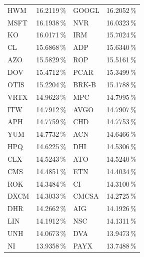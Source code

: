 \begin{longtable}{l c | l c}
    HWM    & 16.2119\,\%            & GOOGL  & 16.2052\,\%                                   \\
    MSFT   & 16.1938\,\%            & NVR    & 16.0323\,\%                                   \\
    KO     & 16.0171\,\%            & IRM    & 15.7024\,\%                                   \\
    CL     & 15.6868\,\%            & ADP    & 15.6340\,\%                                   \\
    AZO    & 15.5829\,\%            & ROP    & 15.5161\,\%                                   \\
    DOV    & 15.4712\,\%            & PCAR   & 15.3499\,\%                                   \\
    OTIS   & 15.2204\,\%            & BRK-B  & 15.1788\,\%                                   \\
    VRTX   & 14.9623\,\%            & MPC    & 14.7995\,\%                                   \\
    ITW    & 14.7912\,\%            & AVGO   & 14.7907\,\%                                   \\
    APH    & 14.7759\,\%            & CHD    & 14.7753\,\%                                   \\
    YUM    & 14.7732\,\%            & ACN    & 14.6466\,\%                                   \\
    HPQ    & 14.6225\,\%            & DHI    & 14.5306\,\%                                   \\
    CLX    & 14.5243\,\%            & ATO    & 14.5240\,\%                                   \\
    CMS    & 14.4851\,\%            & ETN    & 14.4034\,\%                                   \\
    ROK    & 14.3484\,\%            & CI     & 14.3100\,\%                                   \\
    DXCM   & 14.3033\,\%            & CMCSA  & 14.2725\,\%                                   \\
    DHR    & 14.2662\,\%            & AIG    & 14.1926\,\%                                   \\
    LIN    & 14.1912\,\%            & NSC    & 14.1311\,\%                                   \\
    UNH    & 14.0673\,\%            & DVA    & 13.9473\,\%                                   \\
    NI     & 13.9358\,\%            & PAYX   & 13.7488\,\%                                   \\

\end{longtable}
